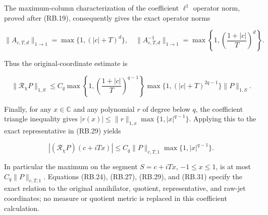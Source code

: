 The maximum-column characterization of the coefficient \(\ell^1\) operator norm, proved after (RB.19), consequently gives the exact operator norms

\[
\|A_{c,T,d}\|_{1\to1}=\max\{1,(|c|+T)^d\},
\quad
\|A_{c,T,d}^{-1}\|_{1\to1}
=\max\left\{1,\left(\frac{1+|c|}{T}\right)^d\right\}.
\tag{RB.35}
\]

Thus the original-coordinate estimate is

\[
\boxed{
\|\mathcal R_\chi P\|_{1,S}
\leq C_q
\max\left\{1,\left(\frac{1+|c|}{T}\right)^{q-1}\right\}
\max\{1,(|c|+T)^{2q-1}\}
\|P\|_{1,S}.}
\tag{RB.36}
\]

Finally, for any \(x\in\mathbb C\) and any polynomial \(r\) of degree below \(q\), the coefficient triangle inequality gives \(|r(x)|\leq\|r\|_{1,x}\max\{1,|x|^{q-1}\}\). Applying this to the exact representative in (RB.29) yields

\[
\boxed{
|(\mathcal R_\chi P)(c+iTx)|
\leq C_q\|P\|_{c,T,1}\max\{1,|x|^{q-1}\}.}
\tag{RB.37}
\]

In particular the maximum on the segment \(S=c+iTx\), \(-1\leq x\leq1\), is at most \(C_q\|P\|_{c,T,1}\). Equations (RB.24), (RB.27), (RB.29), and (RB.31) specify the exact relation to the original annihilator, quotient, representative, and raw-jet coordinates; no measure or quotient metric is replaced in this coefficient calculation.
